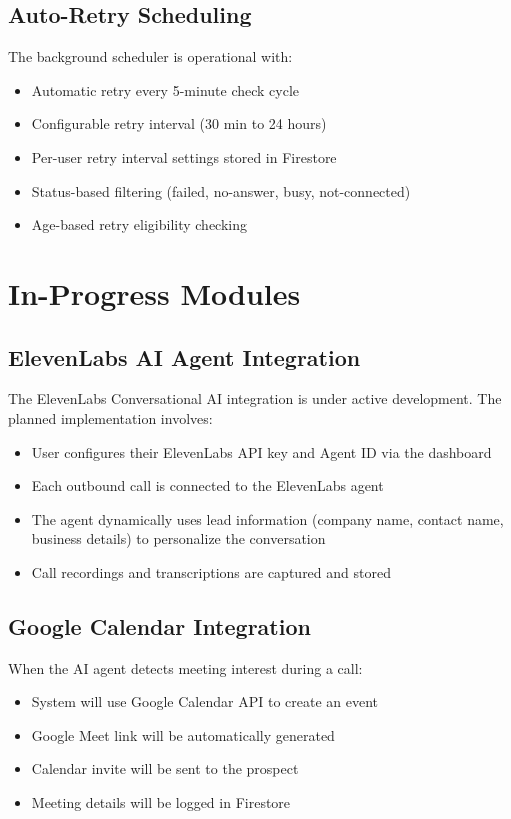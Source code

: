 \documentclass[12pt,a4paper,oneside]{book}
\begin{document}
\subsection{Auto-Retry Scheduling}

The background scheduler is operational with:
\begin{itemize}
    \item Automatic retry every 5-minute check cycle
    \item Configurable retry interval (30 min to 24 hours)
    \item Per-user retry interval settings stored in Firestore
    \item Status-based filtering (failed, no-answer, busy, not-connected)
    \item Age-based retry eligibility checking
\end{itemize}

\section{In-Progress Modules}

\subsection{ElevenLabs AI Agent Integration}

The ElevenLabs Conversational AI integration is under active development. The planned implementation involves:
\begin{itemize}
    \item User configures their ElevenLabs API key and Agent ID via the dashboard
    \item Each outbound call is connected to the ElevenLabs agent
    \item The agent dynamically uses lead information (company name, contact name, business details) to personalize the conversation
    \item Call recordings and transcriptions are captured and stored
\end{itemize}

\subsection{Google Calendar Integration}

When the AI agent detects meeting interest during a call:
\begin{itemize}
    \item System will use Google Calendar API to create an event
    \item Google Meet link will be automatically generated
    \item Calendar invite will be sent to the prospect
    \item Meeting details will be logged in Firestore
\end{itemize}
\end{document}
